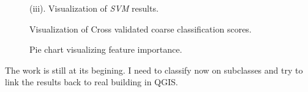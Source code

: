 \documentclass[../main.tex]{subfile}
\begin{document}
\begin{figure}[H]
{{\begin{subfloatrow}[1]
                \end{subfloatrow}
            }
            {
                \caption*{(iii). Visualization of \textit{SVM} results.}
            }
        }
        {
            \caption{\label{fig::class_viz} Visualization of Cross validated coarse classification scores.}
        }
    \end{figure}

    \begin{figure}[H]
        {
            \caption{\label{fig::feat_import} Pie chart visualizing feature importance.}
        }
    \end{figure}

    The work is still at its begining. I need to classify now on subclasses and try to link the results back to real building in QGIS\@.
\end{document}
